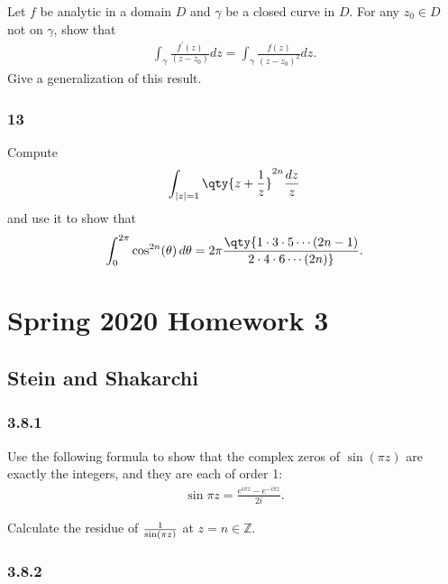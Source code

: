 Let \(f\) be analytic in a domain \(D\) and \(\gamma\) be a closed curve
in \(D\). For any \(z_0\in D\) not on \(\gamma\), show that
\begin{align*}
\int_{\gamma} \frac{f^{\prime}(z)}{\left(z-z_{0}\right)} d z=\int_{\gamma} \frac{f(z)}{\left(z-z_{0}\right)^{2}} d z
.\end{align*}
Give a generalization of this result.

\hypertarget{section-54}{%
\subsubsection{13}\label{section-54}}

Compute
\begin{align*}
\int_{{\left\lvert {z} \right\rvert} = 1} \qty{z + {1\over z}}^{2n} {dz \over z}
\end{align*}
and use it to show that
\begin{align*}
\int_0^{2\pi} \cos^{2n}(\theta) \, d\theta = 2\pi \qty{1\cdot 3 \cdot 5 \cdots (2n-1) \over 2 \cdot 4 \cdot 6 \cdots (2n)}
.\end{align*}

\hypertarget{spring-2020-homework-3}{%
\section{Spring 2020 Homework 3}\label{spring-2020-homework-3}}

\hypertarget{stein-and-shakarchi-1}{%
\subsection{Stein and Shakarchi}\label{stein-and-shakarchi-1}}

\hypertarget{section-55}{%
\subsubsection{3.8.1}\label{section-55}}

Use the following formula to show that the complex zeros of
\(\sin(\pi z)\) are exactly the integers, and they are each of order 1:
\begin{align*}
\sin \pi z=\frac{e^{i \pi z}-e^{-i \pi z}}{2 i}
.\end{align*}

Calculate the residue of \({1\over \sin(\pi z)}\) at
\(z=n\in {\mathbb{Z}}\).

\hypertarget{section-56}{%
\subsubsection{3.8.2}\label{section-56}}

